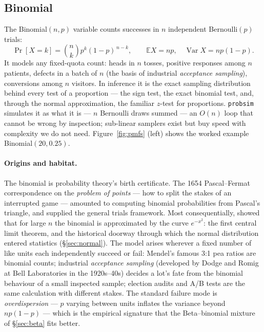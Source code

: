 \documentclass[11pt]{article}
\numberwithin{equation}{section}
\newcommand{\srcref}[1]{%
  \par\smallskip\noindent{\small\sffamily\color{inkS}\raggedright
  $\hookrightarrow$ implemented in \texttt{#1}\par}\smallskip}
\newcommand{\E}{\mathbb{E}}
\newcommand{\Var}{\operatorname{Var}}
\begin{document}
\srcref{src/dist.c: ps\_bernoulli()}

\subsection{Binomial}\label{sec:binomial}

The Binomial$(n,p)$ variable counts successes in $n$ independent
Bernoulli$(p)$ trials:
\[
\Pr[X=k]=\binom{n}{k}p^k(1-p)^{\,n-k},\qquad
\E X = np,\quad \Var X = np(1-p).
\]
It models any fixed-quota count: heads in $n$ tosses, positive responses
among $n$ patients, defects in a batch of $n$ (the basis of industrial
\emph{acceptance sampling}), conversions among $n$ visitors.  In
inference it is the exact sampling distribution behind every test of a
proportion --- the sign test, the exact binomial test, and, through the
normal approximation, the familiar $z$-test for proportions.
\texttt{probsim} simulates it as what it is --- $n$ Bernoulli draws summed
--- an $O(n)$ loop that cannot be wrong by inspection; sub-linear samplers
exist \citep[ch.~X.4]{devroye1986} but buy speed with complexity we do not
need.  Figure~\ref{fig:pmfs} (left) shows the worked example
Binomial$(20, 0.25)$.

\paragraph{Origins and habitat.}
The binomial is probability theory's birth certificate.  The 1654
Pascal--Fermat correspondence on the \emph{problem of points} --- how to
split the stakes of an interrupted game --- amounted to computing binomial
probabilities from Pascal's triangle, and \citet{bernoulli1713} supplied
the general trials framework.  Most consequentially, \citet{demoivre1738}
showed that for large $n$ the binomial is approximated by the curve
$e^{-x^2}$: the first central limit theorem, and the historical doorway
through which the normal distribution entered statistics
(\S\ref{sec:normal}).  The model arises wherever a fixed number of like
units each independently succeed or fail: Mendel's famous 3:1 pea ratios
are binomial counts; industrial \emph{acceptance sampling} (developed by
Dodge and Romig at Bell Laboratories in the 1920s--40s) decides a lot's
fate from the binomial behaviour of a small inspected sample; election
audits and A/B tests are the same calculation with different stakes.  The
standard failure mode is \emph{overdispersion} --- $p$ varying between
units inflates the variance beyond $np(1-p)$ --- which is the empirical
signature that the Beta--binomial mixture of \S\ref{sec:beta} fits better.
\end{document}
